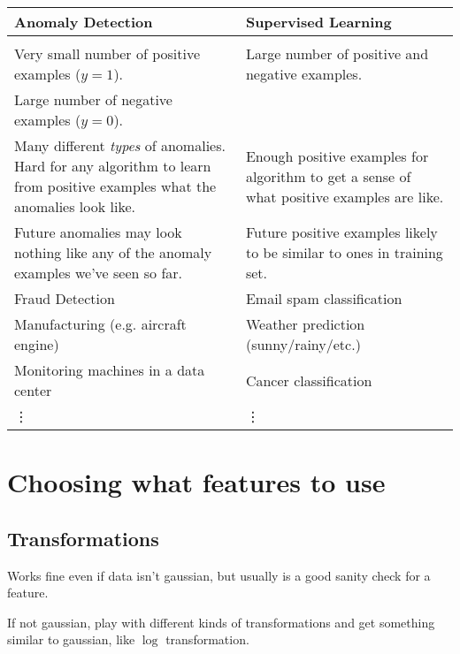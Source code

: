 \begin{tabularx}{0.9\linewidth}{X | X}
    \textbf{Anomaly Detection}                        &
    \textbf{Supervised Learning}                        \\
    \hline                                              \\
    Very small number of positive examples ($y = 1$). &
    Large number of positive and negative examples.     \\
    Large number of negative examples ($y = 0$).        \\
    Many different \emph{types} of anomalies. Hard for
    any algorithm to learn from positive examples what
    the anomalies look like.                          &
    Enough positive examples for algorithm to get a
    sense of what positive examples are like.           \\
    Future anomalies may look
    nothing like any of the anomaly examples we've
    seen so far.                                      &
    Future
    positive examples likely to be similar to ones
    in training set.                                    \\
    Fraud Detection                                   &
    Email spam classification                           \\
    Manufacturing (e.g. aircraft engine)              &
    Weather prediction (sunny/rainy/etc.)               \\
    Monitoring machines in a data center              &
    Cancer classification                               \\
    \vdots                                            &
    \vdots                                              \\
\end{tabularx}

\section{Choosing what features to use}
\subsection{Transformations}
Works fine even if data isn't gaussian, but usually is a good sanity check
for a feature.

If not gaussian, play with different kinds of transformations and get
something similar to gaussian, like $\log$ transformation.

